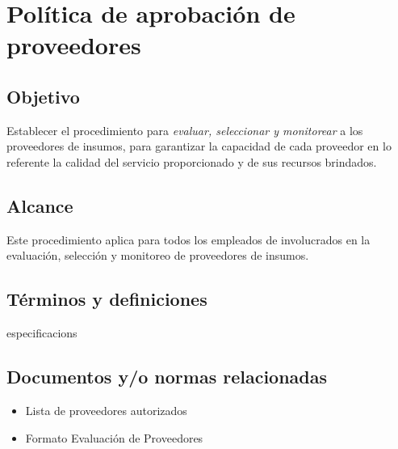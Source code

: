 \renewcommand{\MayorVer}{2}
\renewcommand{\MenorVer}{1}
\renewcommand{\Codigo}{PSA-1-PROG} %
\renewcommand{\FechaPub}{2023--01}
\renewcommand{\Titulo}{Política de aprobación de proveedores}

\section{\Titulo}


\subsection{Objetivo}

Establecer el procedimiento para \emph{evaluar, seleccionar y monitorear} a los proveedores de insumos, para garantizar la capacidad de cada proveedor en lo referente la calidad del servicio proporcionado y de sus recursos brindados.

\subsection{Alcance}

Este procedimiento aplica para todos los empleados de  involucrados en la evaluación, selección y monitoreo de proveedores de insumos.

\subsection{Términos y definiciones}
\begin{description}
    \glspl{especificacion}
\end{description}
\subsection{Documentos y/o normas relacionadas}

\begin{itemize}
    \item Lista de proveedores autorizados
    \item Formato Evaluación de Proveedores
\end{itemize}

